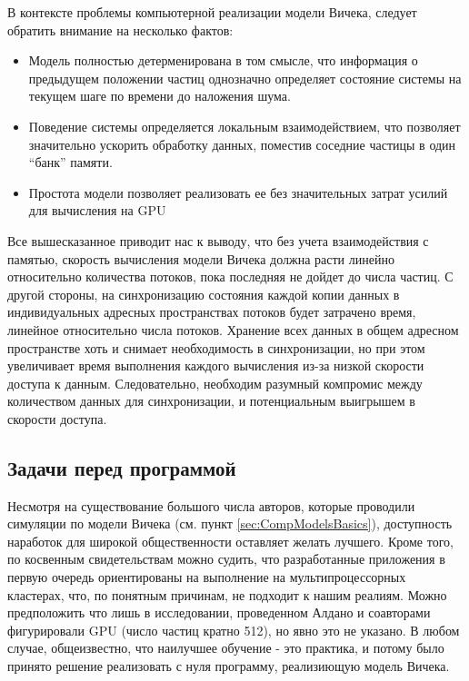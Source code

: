         В контексте проблемы компьютерной реализации модели Вичека, следует обратить внимание на несколько фактов:
        \begin{itemize}
            \item Модель полностью детерменирована в том смысле, что информация о предыдущем положении частиц однозначно определяет состояние системы на текущем шаге по времени до наложения шума.
            \item Поведение системы определяется локальным взаимодействием, что позволяет значительно ускорить обработку данных, поместив соседние частицы в один ``банк'' памяти.
            \item Простота модели позволяет реализовать ее без значительных затрат усилий для вычисления на GPU
        \end{itemize}
        Все вышесказанное приводит нас к выводу, что без учета взаимодействия с памятью, скорость вычисления модели Вичека должна расти линейно относительно количества потоков, пока последняя не дойдет до числа частиц. С другой стороны, на синхронизацию состояния каждой копии данных в индивидуальных адресных пространствах потоков будет затрачено время, линейное относительно числа потоков. Хранение всех данных в общем адресном пространстве хоть и снимает необходимость в синхронизации, но при этом увеличивает время выполнения каждого вычисления из-за низкой скорости доступа к данным. Следовательно, необходим разумный компромис между количеством данных для синхронизации, и потенциальным выигрышем в скорости доступа.


    \subsection{Задачи перед программой} %
    \label{sub:TaksForProgramm}
        Несмотря на существование большого числа авторов, которые проводили симуляции по модели Вичека (см. пункт \ref{sec:CompModelsBasics}), доступность наработок для широкой общественности оставляет желать лучшего. Кроме того, по косвенным свидетельствам можно судить, что разработанные приложения в первую очередь ориентированы на выполнение на мультипроцессорных кластерах, что, по понятным причинам, не подходит к нашим реалиям. Можно предположить что лишь в исследовании, проведенном Алдано и соавторами \cite{baglietto2008,aldana2009} фигурировали GPU (число частиц кратно 512), но явно это не указано. В любом случае, общеизвестно, что наилучшее обучение - это практика, и потому было принято решение реализовать с нуля программу, реализиющую модель Вичека.

